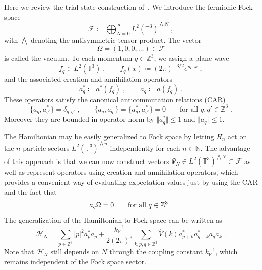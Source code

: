 \documentclass[12pt,a4paper]{article}
\numberwithin{equation}{section}
\newcommand{\cF}{\mathcal{F}}
\newcommand{\TTT}{\mathbb{T}}
\newcommand{\ZZZ}{\mathbb{Z}}
\newcommand{\Zbb}{\mathbb{Z}}
\newcommand{\1}{\mathbb{I}}
\newcommand{\F}{\mathrm{F}}
\newcommand{\kF}{k_\F}
\newcommand{\fock}{\mathcal{F}}
\newcommand{\Nbb}{\mathbb{N}}
\newcommand{\T}{\mathbb{T}}
\newcommand{\Hcal}{\mathcal{H}}
\theoremstyle{plain}
\theoremstyle{definition}
\theoremstyle{remark}
\theoremstyle{plain}
\theoremstyle{definition}
\theoremstyle{remark}
\begin{document}
Here we review the trial state construction of~\cite{CHN23}. We introduce the fermionic Fock space
\begin{equation}
	\cF \coloneq \bigoplus_{N=0}^\infty L^2(\T^3)^{\bigwedge N} \;,
\end{equation}
with $ \bigwedge $ denoting the antisymmetric tensor product. The vector
\begin{equation}
\Omega = (1,0,0,\ldots) \in \cF
\end{equation}
is called the vacuum. To each momentum $ q \in \ZZZ^3 $, we assign a plane wave
\begin{equation}
	f_q \in L^2(\TTT^3) \;, \qquad
	f_q(x) \coloneq (2 \pi)^{-3/2} e^{i q \cdot x} \;,
\end{equation}
and the associated creation and annihilation operators
\begin{equation}
	a^*_q \coloneq a^*(f_q) \;, \qquad
	a_q \coloneq a(f_q) \;.
\end{equation}
These operators satisfy the canonical anticommutation relations (CAR)
\begin{equation} \label{eq:CAR}
	\{a_q, a_{q'}^*\} = \delta_{q, q'} \;, \qquad
	\{a_q, a_{q'}\} = \{a_q^*, a_{q'}^*\} = 0 \qquad \text{for all } q, q' \in \ZZZ^3\;.
\end{equation}
Moreover they are bounded in operator norm by $ \Vert a_q^* \Vert \leq 1$ and $\Vert a_q \Vert \le 1 $.

The Hamiltonian may be easily generalized to Fock space by letting $H_n$ act on the $n$-particle sectors $L^2(\T^3)^{\bigwedge n}$ independently for each $n \in  \Nbb$. The advantage of this approach is that we can now construct vectors $\Psi_N \in L^2(\T^3)^{\bigwedge N} \subset \fock$ as well as represent operators using creation and annihilation operators, which provides a convenient way of evaluating expectation values just by using the CAR and the fact that
\begin{equation}
a_q \Omega = 0 \qquad \textnormal{for all } q\in \Zbb^3 \;.
\end{equation}
The generalization of the Hamiltonian to Fock space can be written as
\begin{equation}
\Hcal_N = \sum_{p \in \Zbb^3} \lvert p\rvert^2 a^*_p a_p + \frac{\kF^{-1}}{2 (2\pi)^3}\sum_{k,p,q \in \Zbb^3} \hat{V}(k) a^*_{p+k} a^*_{q-k} a_q a_k\;.
\end{equation}
Note that $\Hcal_N$ still depends on $N$ through the coupling constant $\kF^{-1}$, which remains independent of the Fock space sector.
\end{document}
